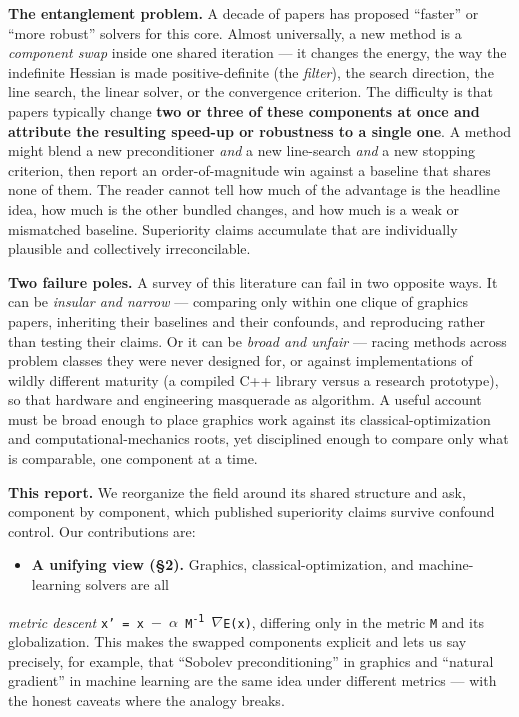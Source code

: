 \documentclass{egpubl}
\begin{document}
\textbf{The entanglement problem.} A decade of papers has proposed ``faster'' or ``more robust'' solvers for
this core. Almost universally, a new method is a \emph{component swap} inside one shared iteration --- it
changes the energy, the way the indefinite Hessian is made positive-definite (the \emph{filter}), the
search direction, the line search, the linear solver, or the convergence criterion. The difficulty is
that papers typically change \textbf{two or three of these components at once and attribute the resulting
speed-up or robustness to a single one}. A method might blend a new preconditioner \emph{and} a new
line-search \emph{and} a new stopping criterion, then report an order-of-magnitude win against a baseline
that shares none of them. The reader cannot tell how much of the advantage is the headline idea, how
much is the other bundled changes, and how much is a weak or mismatched baseline. Superiority claims
accumulate that are individually plausible and collectively irreconcilable.

\textbf{Two failure poles.} A survey of this literature can fail in two opposite ways. It can be \emph{insular
and narrow} --- comparing only within one clique of graphics papers, inheriting their baselines and
their confounds, and reproducing rather than testing their claims. Or it can be \emph{broad and unfair} ---
racing methods across problem classes they were never designed for, or against implementations of
wildly different maturity (a compiled C++ library versus a research prototype), so that hardware and
engineering masquerade as algorithm. A useful account must be broad enough to place graphics work
against its classical-optimization and computational-mechanics roots, yet disciplined enough to
compare only what is comparable, one component at a time.

\textbf{This report.} We reorganize the field around its shared structure and ask, component by component,
which published superiority claims survive confound control. Our contributions are:

\begin{itemize}
  \item \textbf{A unifying view (\S2).} Graphics, classical-optimization, and machine-learning solvers are all
\end{itemize}
  \emph{metric descent} \texttt{x' = x $-$ $\alpha$ M\textsuperscript{-1} $\nabla$E(x)}, differing only in the metric \texttt{M} and its globalization.
  This makes the swapped components explicit and lets us say precisely, for example, that ``Sobolev
  preconditioning'' in graphics and ``natural gradient'' in machine learning are the same idea under
  different metrics --- with the honest caveats where the analogy breaks.
\end{document}
